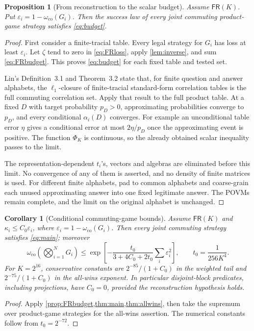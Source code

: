 \documentclass[11pt,reqno]{amsart}
\numberwithin{equation}{section}
\newtheorem{proposition}[theorem]{Proposition}
\newtheorem{corollary}[theorem]{Corollary}
\theoremstyle{definition}
\theoremstyle{remark}
\newcommand{\eps}{\varepsilon}
\newcommand{\co}{\mathrm{co}}
\newcommand{\PhiK}{\Phi_K}
\newcommand{\FR}{\mathsf{FR}}
\begin{document}
\begin{proposition}[From reconstruction to the scalar budget]\label{prop:FRbudget}
Assume \(\FR(K)\). Put \(\eps_i=1-\omega_{\co}(G_i)\). Then the success law of every joint commuting product-game strategy satisfies \eqref{eq:budget}.
\end{proposition}
\begin{proof}
First consider a finite-tracial table. Every legal strategy for \(G_i\) has loss at least \(\eps_i\). Let \(\zeta\) tend to zero in \eqref{eq:FRloss}, apply \cref{lem:inverse}, and sum \eqref{eq:FRbudget}. This proves \eqref{eq:budget} for each fixed table and tested set.

Lin's Definition~3.1 and Theorem~3.2 \cite{LinTr} state that, for finite question and answer alphabets, the \(\ell_1\)-closure of finite-tracial standard-form correlation tables is the full commuting correlation set. Apply that result to the full product table. At a fixed \(D\) with target probability \(p_D>0\), approximating probabilities converge to \(p_D\), and every conditional \(\alpha_i(D)\) converges. For example an unconditional table error \(\eta\) gives a conditional error at most \(2\eta/p_D\) once the approximating event is positive. The function \(\PhiK\) is continuous, so the already obtained scalar inequality passes to the limit.

The representation-dependent \(t_i\)'s, vectors and algebras are eliminated before this limit. No convergence of any of them is asserted, and no density of finite matrices is used. For different finite alphabets, pad to common alphabets and coarse-grain each unused approximating answer into one fixed legitimate answer. The POVMs remain complete, and the limit on the original alphabet is unchanged.
\end{proof}

\begin{corollary}[Conditional commuting-game bounds]\label{cor:games}
Assume \(\FR(K)\) and \(\kappa_i\le C_0\eps_i\), where
\(\eps_i=1-\omega_{\co}(G_i)\). Then every joint commuting strategy satisfies \eqref{eq:main}; moreover
\[
 \omega_{\co}\left(\bigotimes_{i=1}^N G_i\right)
 \le\exp\left[-\frac{t_0}{3+4C_0+2t_0}
                         \sum_i\eps_i^2\right],
 \qquad t_0=\frac1{256K^4}.
\]
For \(K=2^{16}\), conservative constants are \(2^{-85}/(1+C_0)\) in the weighted tail and \(2^{-75}/(1+C_0)\) in the all-wins exponent. In particular disjoint-block predicates, including projections, have \(C_0=0\), provided the reconstruction hypothesis holds.
\end{corollary}
\begin{proof}
Apply \cref{prop:FRbudget,thm:main,thm:allwins}, then take the supremum over product-game strategies for the all-wins assertion. The numerical constants follow from \(t_0=2^{-72}\).
\end{proof}
\end{document}
